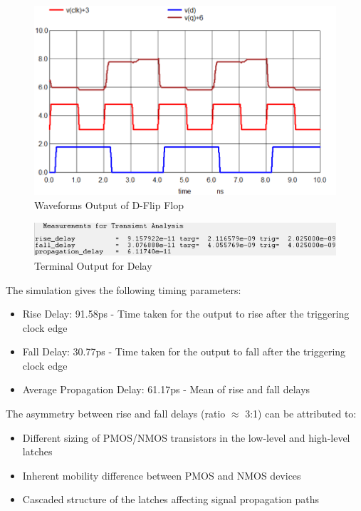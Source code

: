 \documentclass[conference]{IEEEtran}
\begin{document}
\begin{figure}[H]
    \centering
    \includegraphics[width=1\linewidth]{dflipsimres.png}
    \caption{Waveforms Output of D-Flip Flop}
    \label{fig:dff_delay}
\end{figure}

\begin{figure}[H]
    \centering
    \includegraphics[width=1\linewidth]{dflipterm.png}
    \caption{Terminal Output for Delay}
    \label{fig:dff_power}
\end{figure}

The simulation gives the following timing parameters:
\begin{itemize}
    \item Rise Delay: 91.58ps - Time taken for the output to rise after the triggering clock edge
    \item Fall Delay: 30.77ps - Time taken for the output to fall after the triggering clock edge  
    \item Average Propagation Delay: 61.17ps - Mean of rise and fall delays
\end{itemize}

The asymmetry between rise and fall delays (ratio $\approx$ 3:1) can be attributed to:
\begin{itemize}
    \item Different sizing of PMOS/NMOS transistors in the low-level and high-level latches
    \item Inherent mobility difference between PMOS and NMOS devices
    \item Cascaded structure of the latches affecting signal propagation paths
\end{itemize}
\end{document}
